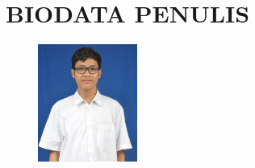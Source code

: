\documentclass[12pt,oneside,reqno]{ta-its}
\begin{document}
	\frontmatter %
	\maketitle
	\legalityPaper %
	
    
	

	\cleardoublepage %

	\tableofcontents %
	\listoftables %
	\listoffigures %
	\lstlistoflistings %

	\mainmatter
	
	
	
	
	
	

	
	
    
    \renewcommand\chaptername{LAMPIRAN}
	\appendix
    
    

	\appendix

	\backmatter %
	\chapter{BIODATA PENULIS}
	\begin{figure}
		\includegraphics[width=0.29\textwidth]{img/CPH.jpg}
	\end{figure}
	
\end{document}
